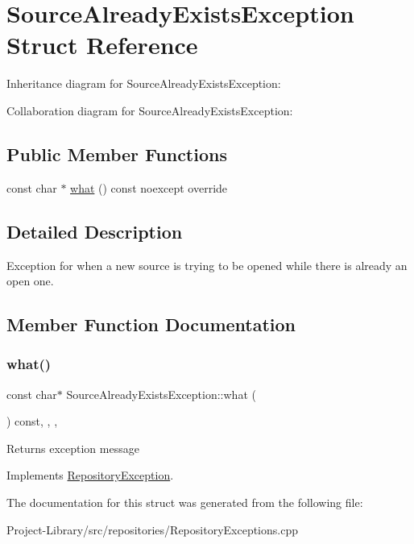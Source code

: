 \hypertarget{structSourceAlreadyExistsException}{}\section{Source\+Already\+Exists\+Exception Struct Reference}
\label{structSourceAlreadyExistsException}


Inheritance diagram for Source\+Already\+Exists\+Exception\+:


Collaboration diagram for Source\+Already\+Exists\+Exception\+:
\subsection*{Public Member Functions}
\begin{DoxyCompactItemize}
\item 
const char $\ast$ \hyperlink{structSourceAlreadyExistsException_a2dcdf3a360520302f791da1273effe74}{what} () const noexcept override
\end{DoxyCompactItemize}


\subsection{Detailed Description}
Exception for when a new source is trying to be opened while there is already an open one. 

\subsection{Member Function Documentation}
\mbox{\label{structSourceAlreadyExistsException_a2dcdf3a360520302f791da1273effe74}} 
\subsubsection{\texorpdfstring{what()}{what()}}
{\footnotesize\ttfamily const char$\ast$ Source\+Already\+Exists\+Exception\+::what (\begin{DoxyParamCaption}{ }\end{DoxyParamCaption}) const\hspace{0.3cm}{\ttfamily [inline]}, {\ttfamily [override]}, {\ttfamily [virtual]}, {\ttfamily [noexcept]}}

Returns exception message 

Implements \hyperlink{structRepositoryException_a6fdc5fe8fe6abdd205402d8648e5ccd4}{Repository\+Exception}.



The documentation for this struct was generated from the following file\+:\begin{DoxyCompactItemize}
\item 
Project-\/\+Library/src/repositories/Repository\+Exceptions.\+cpp\end{DoxyCompactItemize}
